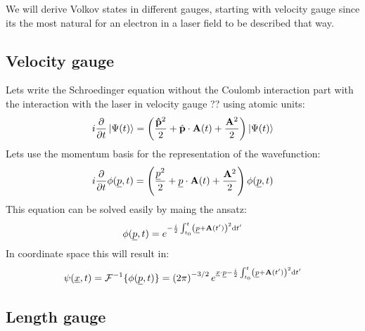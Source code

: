 We will derive Volkov states in different gauges, starting with velocity gauge since its the most natural for an electron in a laser field to be described that way.
\subsection*{Velocity gauge}
Lets write the Schroedinger equation without the Coulomb interaction part with the interaction with the laser in velocity gauge ?? using atomic units:
\begin{equation*}
    i \frac{\partial}{\partial t} \ket{\Psi(t)} = \left( \frac{\mathbf{\hat{p}}^2}{2} + \hat{\mathbf{p}} \cdot \mathbf{A}(t) + \frac{\mathbf{A}^2}{2} \right) \ket{\Psi(t)}
\end{equation*}
Lets use the momentum basis for the representation of the wavefunction: %
\begin{equation*}
    i \frac{\partial}{\partial t} \phi(\underline{p},t) = \left( \frac{\underline{p}^2}{2} + \underline{p} \cdot \mathbf{A}(t) + \frac{\mathbf{A}^2}{2} \right) \phi(\underline{p},t)
\end{equation*}
This equation can be solved easily by maing the ansatz:
\begin{equation*}
    \phi(\underline{p},t) = e^{-\frac{i}{2} \int_{t_0}^{t} \left(\underline{p} + \mathbf{A}(t')\right)^2\mathrm{d} t' }
\end{equation*}
In coordinate space this will result in:
\begin{equation}
    \psi(\underline{x}, t) = \mathcal{F}^{-1}\{\phi(\underline{p}, t)\} = \left(2\pi\right)^{-3/2}e^{\underline{x}\cdot\underline{p}-\frac{i}{2} \int_{t_0}^{t} \left(\underline{p} + \mathbf{A}(t')\right)^2\mathrm{d} t' }
\end{equation}

\subsection*{Length gauge}